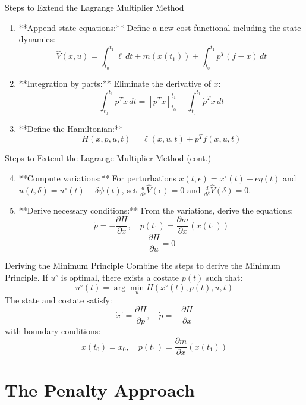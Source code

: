 \documentclass[10pt]{beamer}
\begin{document}
\begin{frame}{Steps to Extend the Lagrange Multiplier Method}
\begin{enumerate}
    \item **Append state equations:** Define a new cost functional including the state dynamics:
    \[
    \hat{V}(x, u) = \int_{t_0}^{t_1} \ell \, dt + m(x(t_1)) + \int_{t_0}^{t_1} p^T (f - \dot{x}) \, dt
    \]
    \item **Integration by parts:** Eliminate the derivative of \( x \):
    \[
    \int_{t_0}^{t_1} p^T \dot{x} \, dt = \left[ p^T x \right]_{t_0}^{t_1} - \int_{t_0}^{t_1} \dot{p}^T x \, dt
    \]
    \item **Define the Hamiltonian:**
    \[
    H(x, p, u, t) = \ell(x, u, t) + p^T f(x, u, t)
    \]
\end{enumerate}
\end{frame}

\begin{frame}{Steps to Extend the Lagrange Multiplier Method (cont.)}
\begin{enumerate}
    \setcounter{enumi}{3}
    \item **Compute variations:** For perturbations \( x(t, \epsilon) = x^\circ(t) + \epsilon \eta(t) \) and \( u(t, \delta) = u^\circ(t) + \delta \psi(t) \), set \( \frac{d}{d\epsilon} \hat{V}(\epsilon) = 0 \) and \( \frac{d}{d\delta} \hat{V}(\delta) = 0 \).
    \item **Derive necessary conditions:** From the variations, derive the equations:
    \[
    \dot{p} = -\frac{\partial H}{\partial x}, \quad p(t_1) = \frac{\partial m}{\partial x}(x(t_1))
    \]
    \[
    \frac{\partial H}{\partial u} = 0
    \]
\end{enumerate}
\end{frame}

\begin{frame}{Deriving the Minimum Principle}
  Combine the steps to derive the Minimum Principle. If \( u^\circ \) is optimal, there exists a costate \( p(t) \) such that:
  \[
  u^\circ(t) = \arg \min_u H(x^\circ(t), p(t), u, t)
  \]
  The state and costate satisfy:
  \[
  \dot{x}^\circ = \frac{\partial H}{\partial p}, \quad \dot{p} = -\frac{\partial H}{\partial x}
  \]
  with boundary conditions:
  \[
  x(t_0) = x_0, \quad p(t_1) = \frac{\partial m}{\partial x}(x(t_1))
  \]
\end{frame}
  
\section{The Penalty Approach}
  
\end{document}
